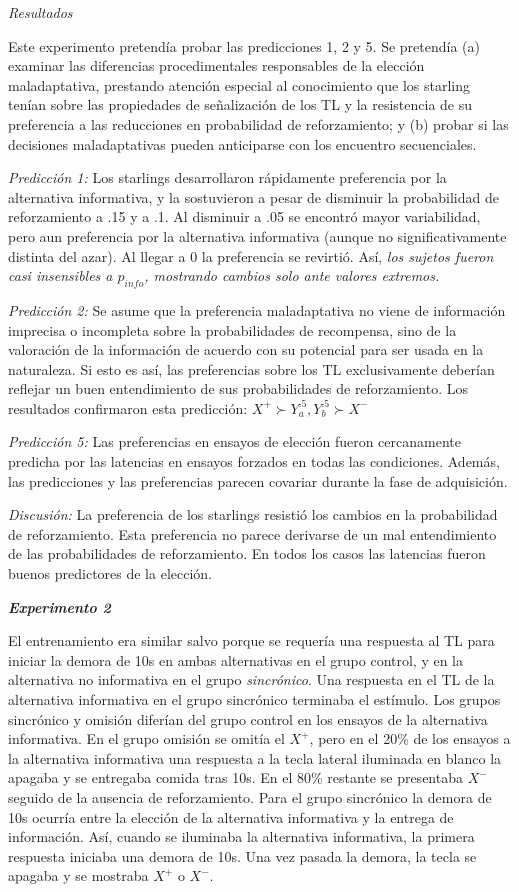 \documentclass[a4paper,12pt]{article}
\begin{document}
{\itshape Resultados}

Este experimento pretendía probar las predicciones 1, 2 y 5. Se pretendía (a) examinar las diferencias procedimentales responsables de la elección maladaptativa, prestando atención especial al conocimiento que los starling tenían sobre las propiedades de señalización de los TL y la resistencia de su preferencia a las reducciones en probabilidad de reforzamiento; y (b) probar si las decisiones maladaptativas pueden anticiparse con los encuentro secuenciales.

{\itshape Predicción 1:} Los starlings desarrollaron rápidamente preferencia por la alternativa informativa, y la sostuvieron a pesar de disminuir la probabilidad de reforzamiento a .15 y a .1. Al disminuir a .05 se encontró mayor variabilidad, pero aun preferencia por la alternativa informativa (aunque no significativamente distinta del azar). Al llegar a 0 la preferencia se revirtió. Así, {\itshape los sujetos fueron casi insensibles a $p_{info}$, mostrando cambios solo ante valores extremos.}

{\itshape Predicción 2:} Se asume que la preferencia maladaptativa no viene de información imprecisa o incompleta sobre la probabilidades de recompensa, sino de la valoración de la información de acuerdo con su potencial para ser usada en la naturaleza. Si esto es así, las preferencias sobre los TL exclusivamente deberían reflejar un buen entendimiento de sus probabilidades de reforzamiento. Los resultados confirmaron esta predicción: $X^+ \succ Y_a^{{.}5},Y_b^{{.}5} \succ X^-$

{\itshape Predicción 5:} Las preferencias en ensayos de elección fueron cercanamente predicha por las latencias en ensayos forzados en todas las condiciones. Además, las predicciones y las preferencias parecen covariar durante la fase de adquisición.

{\itshape Discusión:} La preferencia de los starlings resistió los cambios en la probabilidad de reforzamiento. Esta preferencia no parece derivarse de un mal entendimiento de las probabilidades de reforzamiento. En todos los casos las latencias fueron buenos predictores de la elección.

{\itshape\bfseries Experimento 2}

El entrenamiento era similar salvo porque se requería una respuesta al TL para iniciar la demora de 10s en ambas alternativas en el grupo control, y en la alternativa no informativa en el grupo {\itshape sincrónico}. Una respuesta en el TL de la alternativa informativa en el grupo sincrónico terminaba el estímulo. Los grupos sincrónico y omisión diferían del grupo control en los ensayos de la alternativa informativa. En el grupo omisión se omitía el $X^+$, pero en el 20\% de los ensayos a la alternativa informativa una respuesta a la tecla lateral iluminada en blanco la apagaba y se entregaba comida tras 10s. En el 80\% restante se presentaba $X^-$ seguido de la ausencia de reforzamiento. Para el grupo sincrónico la demora de 10s ocurría entre la elección de la alternativa informativa y la entrega de información. Así, cuando se iluminaba la alternativa informativa, la primera respuesta iniciaba una demora de 10s. Una vez pasada la demora, la tecla se apagaba y se mostraba $X^+$ o $X^-$.
\end{document}
